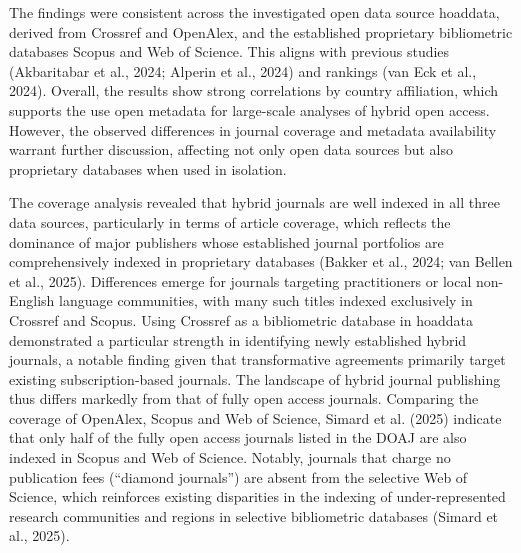 \documentclass[a4paper,man,floatsintext,longtable,noextraspace,10pt]{apa6}
\begin{document}
The findings were consistent across the investigated open data source
hoaddata, derived from Crossref and OpenAlex, and the established
proprietary bibliometric databases Scopus and Web of Science. This
aligns with previous studies (Akbaritabar et al., 2024; Alperin et al.,
2024) and rankings (van Eck et al., 2024). Overall, the results show
strong correlations by country affiliation, which supports the use open
metadata for large-scale analyses of hybrid open access. However, the
observed differences in journal coverage and metadata availability
warrant further discussion, affecting not only open data sources but
also proprietary databases when used in isolation.

The coverage analysis revealed that hybrid journals are well indexed in
all three data sources, particularly in terms of article coverage, which
reflects the dominance of major publishers whose established journal
portfolios are comprehensively indexed in proprietary databases (Bakker
et al., 2024; van Bellen et al., 2025). Differences emerge for journals
targeting practitioners or local non-English language communities, with
many such titles indexed exclusively in Crossref and Scopus. Using
Crossref as a bibliometric database in hoaddata demonstrated a
particular strength in identifying newly established hybrid journals, a
notable finding given that transformative agreements primarily target
existing subscription-based journals. The landscape of hybrid journal
publishing thus differs markedly from that of fully open access
journals. Comparing the coverage of OpenAlex, Scopus and Web of Science,
Simard et al. (2025) indicate that only half of the fully open access
journals listed in the DOAJ are also indexed in Scopus and Web of
Science. Notably, journals that charge no publication fees (``diamond
journals'') are absent from the selective Web of Science, which
reinforces existing disparities in the indexing of under-represented
research communities and regions in selective bibliometric databases
(Simard et al., 2025).
\end{document}
